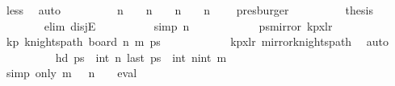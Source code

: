 \begin{isabellebody}
\ less\ \isamarkupfalse%
\ auto\isanewline
\ \ \ \ \ \ \isamarkupfalse%
\ \isamarkupfalse%
\ {\isachardoublequoteopen}n\ {\isacharequal}{\kern0pt}\ {}\ {\isasymor}\ n\ {\isacharequal}{\kern0pt}\ {}\ {\isasymor}\ n\ {\isacharequal}{\kern0pt}\ {}\ {\isasymor}\ n{\isacharminus}{\kern0pt}{}\ {\isasymge}\ {}{\isachardoublequoteclose}\ \isamarkupfalse%
\ presburger\isanewline
\ \ \ \ \ \ \isamarkupfalse%
\ \isamarkupfalse%
\ {\isacharquery}{\kern0pt}thesis\isanewline
\ \ \ \ \ \ \isamarkupfalse%
\ {\isacharparenleft}{\kern0pt}elim\ disjE{\isacharparenright}{\kern0pt}\isanewline
\ \ \ \ \ \ \ \ \isamarkupfalse%
\ {\isacharbrackleft}{\kern0pt}simp{\isacharbrackright}{\kern0pt}{\isacharcolon}{\kern0pt}\ {\isachardoublequoteopen}n\ {\isacharequal}{\kern0pt}\ {}{\isachardoublequoteclose}\isanewline
\ \ \ \ \ \ \ \ \isamarkupfalse%
\ {\isacharquery}{\kern0pt}ps{\isacharequal}{\kern0pt}{\isachardoublequoteopen}mirror{}\ kp{}x{}lr{\isachardoublequoteclose}\isanewline
\ \ \ \ \ \ \ \ \isamarkupfalse%
\ kp{\isacharcolon}{\kern0pt}\ {\isachardoublequoteopen}knights{\isacharunderscore}{\kern0pt}path\ {\isacharparenleft}{\kern0pt}board\ n\ m{\isacharparenright}{\kern0pt}\ {\isacharquery}{\kern0pt}ps{\isachardoublequoteclose}\isanewline
\ \ \ \ \ \ \ \ \ \ \isamarkupfalse%
\ kp{\isacharunderscore}{\kern0pt}{}x{}{\isacharunderscore}{\kern0pt}lr\ mirror{}{\isacharunderscore}{\kern0pt}knights{\isacharunderscore}{\kern0pt}path\ \isamarkupfalse%
\ auto\isanewline
\ \ \ \ \ \ \ \ \isamarkupfalse%
\ {\isachardoublequoteopen}hd\ {\isacharquery}{\kern0pt}ps\ {\isacharequal}{\kern0pt}\ {\isacharparenleft}{\kern0pt}int\ n{\isacharcomma}{\kern0pt}{}{\isacharparenright}{\kern0pt}{\isachardoublequoteclose}\ {\isachardoublequoteopen}last\ {\isacharquery}{\kern0pt}ps\ {\isacharequal}{\kern0pt}\ {\isacharparenleft}{\kern0pt}int\ n{\isacharminus}{\kern0pt}{}{\isacharcomma}{\kern0pt}int\ m{\isacharminus}{\kern0pt}{}{\isacharparenright}{\kern0pt}{\isachardoublequoteclose}\isanewline
\ \ \ \ \ \ \ \ \ \ \isamarkupfalse%
\ {\isacharparenleft}{\kern0pt}simp\ only{\isacharcolon}{\kern0pt}\ {\isacartoucheopen}m\ {\isacharequal}{\kern0pt}\ {}{\isacartoucheclose}\ {\isacartoucheopen}n\ {\isacharequal}{\kern0pt}\ {}{\isacartoucheclose}\ {\isacharbar}{\kern0pt}\ eval{\isacharparenright}{\kern0pt}{\isacharplus}{\kern0pt}\isanewline

\end{isabellebody}
